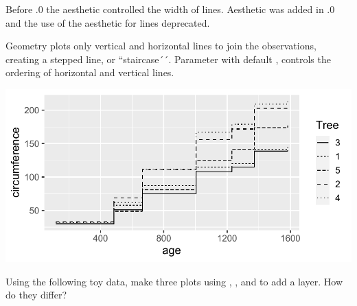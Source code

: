 \documentclass[krantz2]{krantz}\usepackage{knitr}
\begin{document}
\begin{warningbox}
Before .0 the  aesthetic controlled the width of lines. Aesthetic  was added in .0 and the use of the  aesthetic for lines deprecated.
\end{warningbox}

%
Geometry  plots only vertical and horizontal lines to join the observations, creating a stepped line, or ``staircase´´. Parameter  with default , controls the ordering of horizontal and vertical lines.

\begin{knitrout}\footnotesize
{}\color{fgcolor}\begin{kframe}
\begin{alltt}
\hlstd{(} 
        \hlstd{=} \hlstd{(}      \hlopt{+}
  \hlstd{()}
\end{alltt}
\end{kframe}

{\centering \includegraphics[width=.7\textwidth]{figure/pos-step-plot-01-1} 

}


\end{knitrout}

\begin{playground}
Using the following toy data, make three plots using , , and  to add a layer. How do they differ?

\begin{knitrout}\footnotesize
{}\color{fgcolor}\begin{kframe}
\begin{alltt}
 \hlkwb{<-} \hlstd{(} \hlstd{=} \hlstd{(}\hlstd{,}\hlstd{,}\hlstd{,}\hlstd{),}  \hlstd{=} \hlstd{(}\hlstd{,}\hlstd{,}\hlstd{,}\hlstd{))}
\end{alltt}
\end{kframe}
\end{knitrout}
\end{playground}
\end{document}

